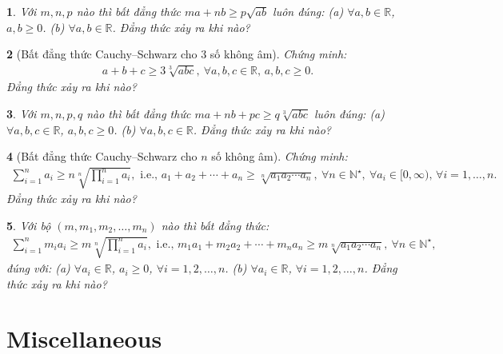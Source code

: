 \documentclass{article}
\newtheorem{baitoan}{}
\begin{document}
\begin{baitoan}
	Với $m,n,p$ nào thì bất đẳng thức $ma + nb\ge p\sqrt{ab}$ luôn đúng: (a) $\forall a,b\in\mathbb{R}$, $a,b\ge0$. (b) $\forall a,b\in\mathbb{R}$. Đẳng thức xảy ra khi nào?
\end{baitoan}

\begin{baitoan}[Bất đẳng thức Cauchy--Schwarz cho 3 số không âm]
	Chứng minh:
	\begin{align*}
		\boxed{a + b + c\ge3\sqrt[3]{abc},\ \forall a,b,c\in\mathbb{R},\,a,b,c\ge 0.}
	\end{align*}
	Đẳng thức xảy ra khi nào?
\end{baitoan}

\begin{baitoan}
	Với $m,n,p,q$ nào thì bất đẳng thức $ma + nb + pc\ge q\sqrt[3]{abc}$ luôn đúng: (a) $\forall a,b,c\in\mathbb{R}$, $a,b,c\ge0$. (b) $\forall a,b,c\in\mathbb{R}$. Đẳng thức xảy ra khi nào?
\end{baitoan}

\begin{baitoan}[Bất đẳng thức Cauchy--Schwarz cho $n$ số không âm]
	Chứng minh:
	\begin{align*}
		\sum_{i=1}^n a_i\ge n\sqrt[n]{\prod_{i=1}^n a_i},\mbox{ i.e., } a_1 + a_2 + \cdots + a_n\ge\sqrt[n]{a_1a_2\cdots a_n},\ \forall n\in\mathbb{N}^\star,\ \forall a_i\in[0,\infty),\,\forall i = 1,\ldots,n.
	\end{align*}
	Đẳng thức xảy ra khi nào?
\end{baitoan}

\begin{baitoan}
	Với bộ $(m,m_1,m_2,\ldots,m_n)$ nào thì bất đẳng thức:
	\begin{align*}
		\sum_{i=1}^n m_ia_i\ge m\sqrt[n]{\prod_{i=1}^n a_i},\mbox{ i.e., } m_1a_1 + m_2a_2 + \cdots + m_na_n\ge m\sqrt[n]{a_1a_2\cdots a_n},\ \forall n\in\mathbb{N}^\star,
	\end{align*}
	đúng với: (a) $\forall a_i\in\mathbb{R}$, $a_i\ge0$, $\forall i = 1,2,\ldots,n$. (b) $\forall a_i\in\mathbb{R}$, $\forall i = 1,2,\ldots,n$.
	Đẳng thức xảy ra khi nào?
\end{baitoan}



\section{Miscellaneous}
\end{document}
